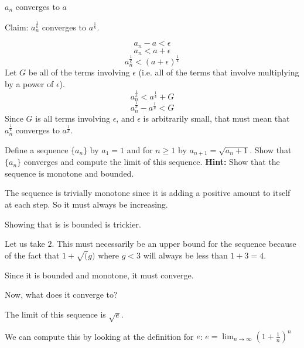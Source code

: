 \documentclass[answers]{exam}
\theoremstyle{remark}
\theoremstyle{definition}
\begin{document}
\begin{questions}
\begin{solution}
$a_n$ converges to $a$

Claim: $a_n^{\frac{1}{k}}$ converges to $a^{\frac{1}{k}}$.

\[a_n - a < \epsilon\]
\[a_n < a + \epsilon\]
\[a_n^{\frac{1}{k}} < (a + \epsilon)^{\frac{1}{k}}\]
Let $G$ be all of the terms involving $\epsilon$
(i.e. all of the terms that involve multiplying by a power of $\epsilon$).
\[a_n^{\frac{1}{k}} < a^{\frac{1}{k}} + G\]
\[a_n^{\frac{1}{k}} - a^{\frac{1}{k}} < G\]
Since $G$ is all terms involving $\epsilon$,
and $\epsilon$ is arbitrarily small,
that must mean that $a_n^{\frac{1}{k}}$ converges to $a^{\frac{1}{k}}$.





\end{solution}


\question Define a sequence $\{a_n\}$ by $a_1=1$ and for $n \ge 1$ by $a_{n+1}= \sqrt{a_n+1}$. Show that $\{a_n\}$ converges and compute the limit of this sequence. \textbf{Hint:} Show that the sequence is monotone and bounded.

\begin{solution}


The sequence is trivially monotone since it is adding a positive amount to itself
at each step. So it must always be increasing.

Showing that is is bounded is trickier.

Let us take $2$. This must necessarily be an upper bound for the sequence
because of the fact that $1 + \sqrt(g)$ where $g < 3$ will always be less than $1+3 = 4$.

Since it is bounded and monotone, it must converge.


Now, what does it converge to?

The limit of this sequence is $\sqrt{e}$.

We can compute this by looking at the definition for $e$:
$e = \lim_{n \to \infty} \left(1 + \frac{1}{n} \right)^{n}$



\end{solution}


\end{questions}
\end{document}
